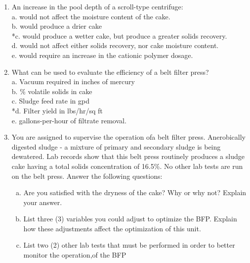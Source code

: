 \begin{enumerate}
\item  An increase in the pool depth of a scroll-type centrifuge: \\

a. would not affect the moisture content of the cake. \\
b. would produce a drier cake \\
*c. would produce a wetter cake, but produce a greater solids recovery. \\
d. would not affect either solids recovery, nor cake moisture content. \\
e. would require an increase in the cationic polymer dosage. \\

\item  What can be used to evaluate the efficiency of a belt filter press? \\

a. Vacuum required in inches of mercury \\
b. \% volatile solids in cake \\
c. Sludge feed rate in gpd \\
*d. Filter yield in lbs/hr/sq ft \\
e. gallons-per-hour of filtrate removal. \\




\item You are assigned to supervise the operation ofa belt filter press.  Anerobically digested sludge - a mixture of primary and secondary sludge is being dewatered. Lab records show that this belt press routinely produces a sludge cake having a total solids concentration of 16.5\%. No other lab tests are run on the belt press. Answer the following questions: 
\begin{enumerate}[a.]
\item Are you satisfied with the dryness of the cake? Why or why not? Explain your answer.
\item List three (3) variables you could adjust to optimize the BFP. Explain how these adjustments affect the optimization of this unit. 
\item List two (2) other lab tests that must be performed in order to better monitor the operation,of the BFP
\end{enumerate}


\end{enumerate}
